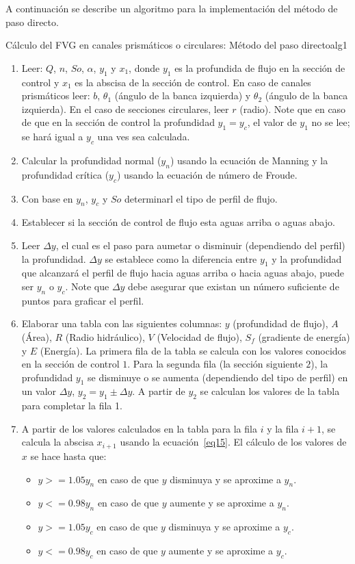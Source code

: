 \documentclass[11pt, oneside]{article}
\begin{document}
A continuaci\'on se describe un algoritmo para la implementaci\'on del m\'etodo de paso directo.
\begin{alg}{C\'alculo del FVG en canales prism\'aticos o circulares: M\'etodo del paso directo}{alg1}
\begin{enumerate}
\item Leer: $Q$, $n$, $So$, $\alpha$, $y_1$ y $x_1$, donde $y_1$ es la profundida de flujo en la secci\'on de control y $x_1$ es la abscisa de la secci\'on de control.  En caso de canales prism\'aticos leer: $b$, $\theta_1$ (\'angulo de la banca izquierda) y $\theta_2$ (\'angulo de la banca izquierda). En el caso de secciones circulares, leer $r$ (radio). Note que en caso de que en la secci\'on de control la profundidad $y_1 = y_c$, el valor de $y_1$ no se lee; se har\'a igual a $y_c$ una ves sea calculada.   
\item Calcular la profundidad normal ($y_n$) usando la ecuaci\'on de Manning y la profundidad cr\'itica ($y_c$) usando la ecuaci\'on de n\'umero de Froude. 
\item Con base en $y_n$, $y_c$ y $So$ determinarl el tipo de perfil de flujo.
\item Establecer si la secci\'on de control de flujo esta aguas arriba o aguas abajo. 
\item Leer $\Delta y$, el cual es el paso para aumetar o disminuir (dependiendo del perfil) la profundidad. $\Delta y$ se establece como la diferencia entre $y_1$ y la profundidad que alcanzar\'a el perfil de flujo hacia aguas arriba o hacia aguas abajo, puede ser $y_n$ o $y_c$. Note que $\Delta y$ debe asegurar que existan un n\'umero suficiente de puntos para graficar el perfil. 
\item Elaborar una tabla con las siguientes columnas: $y$ (profundidad de flujo), $A$ (\'Area), $R$ (Radio hidr\'aulico), $V$ (Velocidad de flujo), $S_f$ (gradiente de energ\'ia) y $E$ (Energ\'ia). La primera fila de la tabla se calcula con los valores conocidos en la secci\'on de control $1$. Para la segunda fila (la secci\'on siguiente $2$),  la profundidad $y_1$ se disminuye o se aumenta (dependiendo del tipo de perfil) en un valor $\Delta y$, $y_2 = y_1 \pm \Delta y $. A partir de $y_2$ se calculan los valores de la tabla para completar la fila 1. 
\item A partir de los valores calculados en la tabla para la fila $i$ y la fila $i+1$, se calcula la abscisa $x_{i+1}$ usando la ecuaci\'on~\ref{eq15}. El c\'alculo de los valores de $x$ se hace hasta que:
    \begin{itemize}
        \item $y>=1.05 y_n$ en caso de que $y$ disminuya y se aproxime a $y_n$.
        \item $y<=0.98 y_n$ en caso de que $y$ aumente y se aproxime a $y_n$.
        \item $y>=1.05 y_c$ en caso de que $y$ disminuya y se aproxime a $y_c$.
        \item $y<=0.98 y_c$ en caso de que $y$ aumente y se aproxime a $y_c$.
    \end{itemize}


\end{enumerate}
\end{alg}
\end{document}
